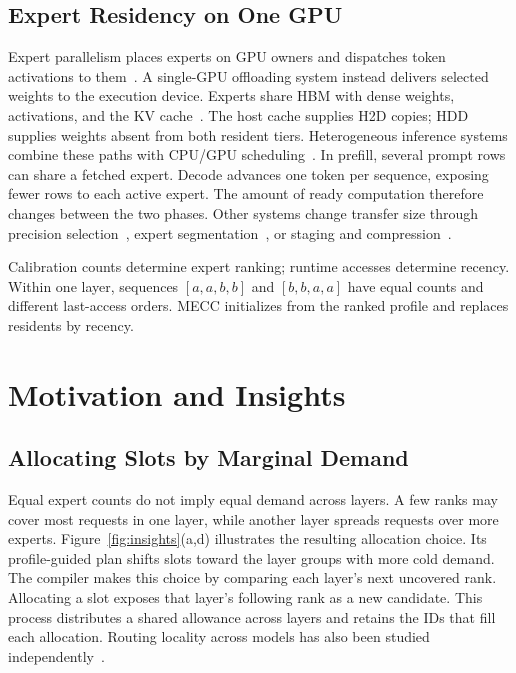 \documentclass[conference,9pt,letterpaper]{IEEEtran}
\begin{document}
\subsection{Expert Residency on One GPU}
Expert parallelism places experts on GPU owners and dispatches token activations to them~\cite{deepspeedmoe,tutel,megablocks,flashmoedist,harmoeny}. A single-GPU offloading system instead delivers selected weights to the execution device. Experts share HBM with dense weights, activations, and the KV cache~\cite{pagedattention,sglang}. The host cache supplies H2D copies; HDD supplies weights absent from both resident tiers. Heterogeneous inference systems combine these paths with CPU/GPU scheduling~\cite{flexgen,dsinference,zeroinfinity,llmflash,powerinfer,hetegen}. In prefill, several prompt rows can share a fetched expert. Decode advances one token per sequence, exposing fewer rows to each active expert. The amount of ready computation therefore changes between the two phases. Other systems change transfer size through precision selection~\cite{hobbit,specter}, expert segmentation~\cite{moepic,slicemoe}, or staging and compression~\cite{mira,zipmoe}.

Calibration counts determine expert ranking; runtime accesses determine recency. Within one layer, sequences $[a,a,b,b]$ and $[b,b,a,a]$ have equal counts and different last-access orders. MECC initializes from the ranked profile and replaces residents by recency.

\section{Motivation and Insights}
\label{sec:challenges}
\subsection{Allocating Slots by Marginal Demand}
Equal expert counts do not imply equal demand across layers. A few ranks may cover most requests in one layer, while another layer spreads requests over more experts. Figure~\ref{fig:insights}(a,d) illustrates the resulting allocation choice. Its profile-guided plan shifts slots toward the layer groups with more cold demand. The compiler makes this choice by comparing each layer's next uncovered rank. Allocating a slot exposes that layer's following rank as a new candidate. This process distributes a shared allowance across layers and retains the IDs that fill each allocation. Routing locality across models has also been studied independently~\cite{routingconsistency}.
\end{document}

